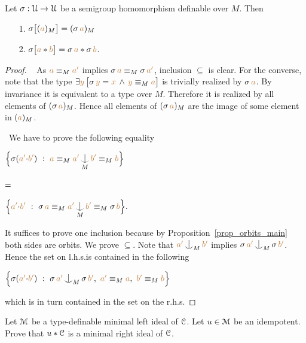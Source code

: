 \begin{proposition}\label{prop_HJ_tecnical}
Let $\sigma:\EuScript U\to\EuScript U$ be a semigroup homomorphism definable over $M$.
Then 
\begin{itemize}
\item[1.] $\sigma\big[({\color{brown} a})_M\big]=(\sigma\,{\color{brown} a})_M$

\item[2.]
$\sigma\big[{\color{brown} a}*{\color{brown} b}\big]=\sigma\,{\color{brown} a}*\sigma\,{\color{brown} b}$.
\end{itemize}
\end{proposition}
\begin{proof}\   
As ${\color{brown} a}\equiv_M{\color{brown} a'}$ implies $\sigma\,{\color{brown} a}\equiv_M\sigma\,{\color{brown} a'}$,
inclusion $\subseteq$ is clear.
For the converse, note that the type 
$\exists{\color{brown}y}\,\big[\sigma\,{\color{brown} y}={\color{brown} x}\,\wedge\,{\color{brown} y}\equiv_M{\color{brown} a}\big]$ 
is trivially realized by $\sigma\,{\color{brown} a}$.
By invariance it is equivalent to a type over $M$.
Therefore it is realized by all elements of $(\sigma\,{\color{brown} a})_M$.
Hence all elements of $(\sigma\,{\color{brown} a})_M$ are the image of some element in $({\color{brown} a})_M$.

\def\medrel#1{\parbox[t]{6ex}{$\displaystyle\hfil #1$}}
\def\ceq#1#2#3{\parbox[t]{39ex}{$\displaystyle #1$}\medrel{#2}{$\displaystyle #3$}}
 \  
We have to prove the following equality\smallskip

\ceq{\hfill\Big\{\sigma({\mr a'}{\cdot}{\mr b'})\ :\ {\mr a}\equiv_M{\mr a'}\nonfork_M{\mr b'}\equiv_M{\mr b} \Big\}}
{=}
{\Big\{{\mr a'}{\cdot}{\mr b'}\ :\ \sigma\,{\mr a}\equiv_M{\mr a'}\nonfork_M{\mr b'}\equiv_M\sigma\,{\mr b} \Big\}.}\smallskip

It suffices to prove one inclusion because by Proposition~\ref{prop_orbits_main} both sides are orbits.
We prove $\subseteq$.
Note that ${\mr a'}\nonfork_M{\mr b'}$ implies $\sigma\,{\mr a'}\nonfork_M\sigma\,{\mr b'}$.
Hence the set on l.h.s.\@ is contained in the following\smallskip

\hfil$\Big\{\sigma({\mr a'}{\cdot}{\mr b'})\ :\ \sigma\,{\mr a'}\nonfork_M\sigma\,{\mr b'},\ {\mr a'}\equiv_M{\mr a},\  {\mr b'}\equiv_M{\mr b} \Big\}$\smallskip

which is in turn contained in the set on the r.h.s.
\end{proof}
 
\begin{exercise}
  Let $\EuScript M$ be a type-definable minimal left ideal of $\EuScript C$.
  Let $u\in\EuScript M$ be an idempotent.
  Prove that $u*\EuScript C$ is a minimal right ideal of $\EuScript C$.
\end{exercise}

